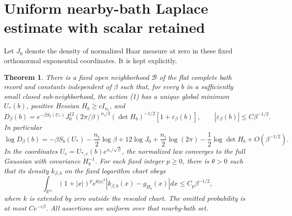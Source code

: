 \documentclass{article}
\newtheorem{theorem}{Theorem}
\begin{document}
\section{Uniform nearby-bath Laplace estimate with scalar retained}
Let $J_0$ denote the density of normalized Haar measure at zero in these fixed orthonormal exponential coordinates. It is kept explicitly.
\begin{theorem}
There is a fixed open neighborhood $\mathcal B$ of the flat complete bath record and constants independent of $\beta$ such that, for every $b$ in a sufficiently small closed sub-neighborhood, the action (1) has a unique global minimum $U_*(b)$, positive Hessian $H_b\geq cI_{n_i}$, and
\[
 D_\beta(b)=e^{-\beta S_b(U_*)}
 J_0^{12}(2\pi/\beta)^{n_i/2}(\det H_b)^{-1/2}
 [1+\varepsilon_\beta(b)],\qquad
 |\varepsilon_\beta(b)|\leq C\beta^{-1/2}.
 \tag{6}
\]
In particular
\[
 \log D_\beta(b)=-\beta S_b(U_*)-\frac{n_i}{2}\log\beta
 +12\log J_0+\frac{n_i}{2}\log(2\pi)
 -\frac12\log\det H_b+O(\beta^{-1/2}).
 \tag{7}
\]
In the coordinates $U_e=U_{*,e}(b)e^{x_e/\sqrt\beta}$, the normalized law converges to the full Gaussian with covariance $H_b^{-1}$. For each fixed integer $p\geq0$, there is $\theta>0$ such that its density $k_{\beta,b}$ on the fixed logarithm chart obeys
\[
 \int_{\mathbb R^{n_i}}(1+|x|)^pe^{\theta|x|^2}
 |k_{\beta,b}(x)-g_{H_b}(x)|dx\leq C_p\beta^{-1/2},
 \tag{8}
\]
where $k$ is extended by zero outside the rescaled chart. The omitted probability is at most $Ce^{-c\beta}$. All assertions are uniform over that nearby-bath set.
\end{theorem}
\end{document}
